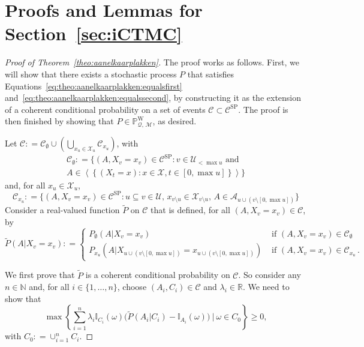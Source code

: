 \documentclass[10pt,a4paper]{paper}
\theoremstyle{definition}
\newcommand{\nats}{\mathbb{N}}
\newcommand{\reals}{\mathbb{R}}
\newcommand{\states}{\mathcal{X}}
\newcommand{\processes}{\mathbb{P}}
\newcommand{\wprocesses}{\processes^{\mathrm{W}}}
\newcommand{\ind}[1]{\mathbb{I}_{#1}}
\newcommand{\rateset}{\mathcal{Q}}
\newcommand{\coloneqq}{:\!=}
\begin{document}
\section{Proofs and Lemmas for Section~\ref{sec:iCTMC}}


\begin{proof}[Proof of Theorem~\ref{theo:aanelkaarplakken}]
The proof works as follows. First, we will show that there exists a stochastic process $P$ that satisfies Equations~\eqref{eq:theo:aanelkaarplakken:equalsfirst} and~\eqref{eq:theo:aanelkaarplakken:equalssecond}, by constructing it as the extension of a coherent conditional probability on a set of events $\mathcal{C}\subset\mathcal{C}^\mathrm{SP}$. The proof is then finished by showing that $P\in\wprocesses_{\rateset,\,\mathcal{M}}$, as desired.

Let $\mathcal{C}\coloneqq\mathcal{C}_\emptyset\cup(\bigcup_{x_u\in\states_u}\mathcal{C}_{x_u})$, with
\begin{multline}\label{eq:theo:aanelkaarplakken:firstpartofdomain}
\mathcal{C}_\emptyset\coloneqq
\{(A,X_v=x_v)\in\mathcal{C}^{\mathrm{SP}}\colon v\in\mathcal{U}_{< \max u}\text{~and~}\\A\in\left\langle
\left\{
(X_t=x)
\colon
x\in\states,t\in[0,\max u]
\right\}
\right\rangle\}
\end{multline}
and, for all $x_u\in\states_u$,
\begin{equation}\label{eq:theo:aanelkaarplakken:secondpartofdomain}
\mathcal{C}_{x_u}\coloneqq\{
(A,X_v=x_v)\in\mathcal{C}^\mathrm{SP}
\colon
u\subseteq v\in\mathcal{U},\,
x_{v\setminus u}\in\states_{v\setminus u},\,
 A\in\mathcal{A}_{u\cup(v\setminus[0,\max u])}
\}
\end{equation}
Consider a real-valued function $\tilde{P}$ on $\mathcal{C}$ that is defined, for all $(A,X_v=x_v)\in\mathcal{C}$, by
\begin{equation}\label{eq:theo:aanelkaarplakken:defPtilde}
\tilde{P}(A\vert X_v=x_v)
\coloneqq
\begin{cases}
P_\emptyset(A\vert X_v=x_v)&\text{~if $(A,X_v=x_v)\in\mathcal{C}_\emptyset$}\\
P_{x_u}(A\vert 
X_{u\cup(v\setminus[0,\max u])}=x_{u\cup(v\setminus[0,\max u])})&\text{~if $(A,X_v=x_v)\in\mathcal{C}_{x_u}$}\,.
\end{cases}
\end{equation}


We first prove that $\tilde{P}$ is a coherent conditional probability on $\mathcal{C}$. So consider any $n\in\nats$ and, for all $i\in\{1,\dots,n\}$, choose $(A_i,C_i)\in\mathcal{C}$ and $\lambda_i\in\reals$. We need to show that
\begin{equation}\label{eq:theo:aanelkaarplakken:coh}
\max\left\{\sum_{i=1}^n\lambda_i\ind{C_i}(\omega)\bigl(\tilde{P}(A_i\vert C_i)-\ind{A_i}(\omega)\bigr)~\Bigg\vert~\omega\in C_0\right\}\geq0,
\end{equation}
with $C_0\coloneqq\cup_{i=1}^nC_i$.


\end{proof}
\end{document}
